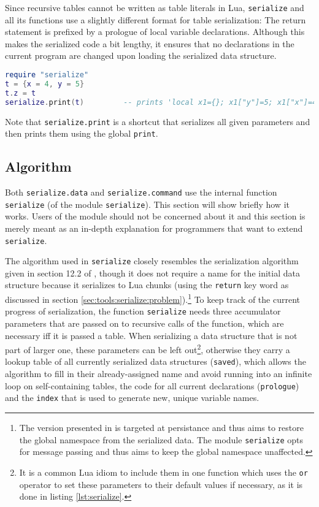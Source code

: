 Since recursive tables cannot be written as table literals in Lua, \texttt{serialize} and all its functions use a slightly different format for table serialization: The return statement is prefixed by a prologue of local variable declarations. Although this makes the serialized code a bit lengthy, it ensures that no declarations in the current program are changed upon loading the serialized data structure.

\begin{lstlisting}[language=lua, caption={Serializing a recursive table}, label=lst:serializeprint, name=lst:serializeprint]
require "serialize"
t = {x = 4, y = 5}
t.z = t
serialize.print(t)         -- prints 'local x1={}; x1["y"]=5; x1["x"]=4; x1["z"]=x1; return (x1)'
\end{lstlisting}

Note that \texttt{serialize.print} is a shortcut that serializes all given parameters and then prints them using the global \texttt{print}.

\subsection{Algorithm}
\label{sec:tools:algorithm}

Both \texttt{serialize.data} and \texttt{serialize.command} use the internal function \texttt{serialize} (of the module \texttt{serialize}). This section will show briefly how it works. Users of the module should not be concerned about it and this section is merely meant as an in-depth explanation for programmers that want to extend \texttt{serialize}.

The algorithm used in \texttt{serialize} closely resembles the serialization algorithm given in section 12.2 of \cite{Ierusalimschy2006}, though it does not require a name for the initial data structure because it serializes to Lua chunks (using the \texttt{return} key word as discussed in section \ref{sec:tools:serialize:problem}).\footnote{The version presented in \cite{Ierusalimschy2006} is targeted at persistance and thus aims to restore the global namespace from the serialized data. The module \texttt{serialize} opts for message passing and thus aims to keep the global namespace unaffected.} To keep track of the current progress of serialization, the function \texttt{serialize} needs three accumulator parameters that are passed on to recursive calls of the function, which are necessary iff it is passed a table. When serializing a data structure that is not part of larger one, these parameters can be left out\footnote{It is a common Lua idiom to include them in one function which uses the \texttt{or} operator to set these parameters to their default values if necessary, as it is done in listing \ref{lst:serialize}.}, otherwise they carry a lookup table of all currently serialized data structures (\texttt{saved}), which allows the algorithm to fill in their already-assigned name and avoid running into an infinite loop on self-containing tables, the code for all current declarations (\texttt{prologue}) and the \texttt{index} that is used to generate new, unique variable names.

